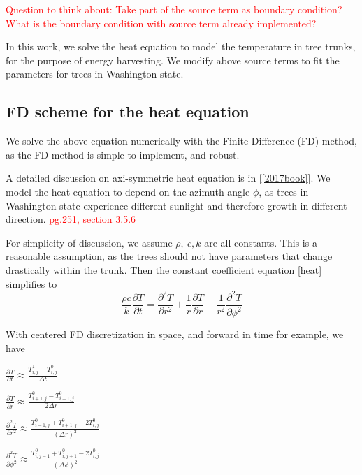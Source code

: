 \documentclass[12pt]{article}
\begin{document}
\textcolor{red}{Question to think about: Take part of the source term as boundary condition? What is the boundary condition with source term already implemented?}

In this work, we solve the heat equation to model the temperature in tree trunks, for the purpose of energy harvesting. We modify above source terms to fit the parameters for trees in Washington state.




\subsection{FD scheme for the heat equation}
We solve the above equation numerically with the Finite-Difference (FD) method, as the FD method is simple to implement, and robust.  

A detailed discussion on axi-symmetric heat equation is in [\ref{2017book}]. We model the heat equation to depend on the azimuth angle $\phi$, as trees in Washington state experience different sunlight and therefore growth in different direction. \textcolor{red}{pg.251, section 3.5.6}

For simplicity of discussion, we assume $\rho,\ c, k$ are all constants. This is a reasonable assumption, as the trees should not have parameters that change drastically within the trunk. Then the constant coefficient equation \eqref{heat} simplifies to 
\begin{equation}
\frac{\rho c}{k}\frac{\partial T}{\partial t}=\frac{\partial^2 T}{\partial r^2}+\frac{1}{r}\frac{\partial T}{\partial r}+\frac{1}{r^2}\frac{\partial^2 T}{\partial \phi^2}\label{simple_heat}
\end{equation}

With centered FD discretization in space, and forward in time for example, we have
\begin{itemize}\begin{multicols}{2}
\item $\frac{\partial T}{\partial t}\approx\frac{T^1_{i,j}-T^0_{i,j}}{\Delta t}$
\item $\frac{\partial T}{\partial r}\approx\frac{T^0_{i+1,j}-T^0_{i-1,j}}{2\Delta r}$
\item $\frac{\partial^2 T}{\partial r^2}\approx\frac{T^0_{i-1,j}+T^0_{i+1,j}-2T^0_{i,j}}{(\Delta r)^2}$
\item $\frac{\partial^2 T}{\partial \phi^2}\approx\frac{T^0_{i,j-1}+T^0_{i,j+1}-2T^0_{i,j}}{(\Delta \phi)^2}$
\end{multicols}\end{itemize}
\end{document}
